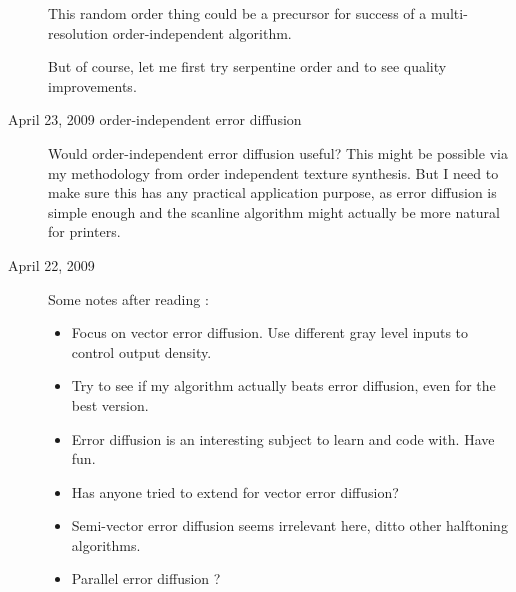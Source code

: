 \begin{description}
{This random order thing could be a precursor for success of a multi-resolution order-independent algorithm.

But of course, let me first try serpentine order and \cite{Ostromoukhov:2001:SEE,Zhou:2003:IMT} to see quality improvements.
}
\item[April 23, 2009 order-independent error diffusion]
{
Would order-independent error diffusion useful? This might be possible via my methodology from order independent texture synthesis.
But I need to make sure this has any practical application purpose, as error diffusion is simple enough and the scanline algorithm might actually be more natural for printers.
}
\item[April 22, 2009]
{
Some notes after reading \cite{Sharma:2002:DCI}:
\begin{itemize}
\item{Focus on vector error diffusion. Use different gray level inputs to control output density.}
\item{Try to see if my algorithm actually beats error diffusion, even for the best version.}
\item{Error diffusion is an interesting subject to learn and code with. Have fun.}
\item{Has anyone tried to extend \cite{Ostromoukhov:2001:SEE} for vector error diffusion?}
\item{Semi-vector error diffusion seems irrelevant here, ditto other halftoning algorithms.}
\item{Parallel error diffusion \cite{Metaxas:2003:PDH}?}
\end{itemize}
}
\end{description}
